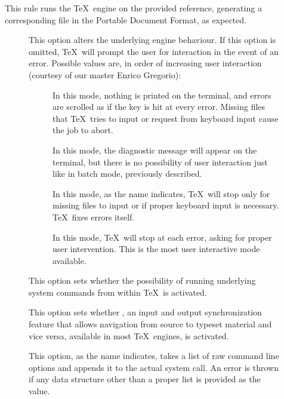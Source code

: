 \begin{description}
\item[]
This rule runs the  \TeX\ engine on the provided  reference, generating a corresponding file in the Portable Document Format, as expected.

\begin{description}
\item[] This option alters the underlying engine behaviour. If this option is omitted, \TeX\ will prompt the user for interaction in the event of an error. Possible values are, in order of increasing user interaction (courtesy of our master Enrico Gregorio):

\begin{description}
\item[] In this mode, nothing is printed on the terminal, and errors are scrolled as if the  key is hit at every error. Missing files that \TeX\ tries to input or request from keyboard input cause the job to abort.

\item[] In this mode, the diagnostic message will appear on the terminal, but there is no possibility of user interaction just like in batch mode, previously described.

\item[] In this mode, as the name indicates, \TeX\ will stop only for missing files to input or if proper keyboard input is necessary. \TeX\ fixes errors itself.

\item[] In this mode, \TeX\ will stop at each error, asking for proper user intervention. This is the most user interactive mode available.
\end{description}

\item[] This option sets whether the possibility of running underlying system commands from within \TeX\ is activated.

\item[] This option sets whether , an input and output synchronization feature that allows navigation from source to typeset material and vice versa, available in most \TeX\ engines, is activated.

\item[] This option, as the name indicates, takes a list of raw command line options and appends it to the actual system call. An error is thrown if any data structure other than a proper list is provided as the value.
\end{description}


\end{description}
